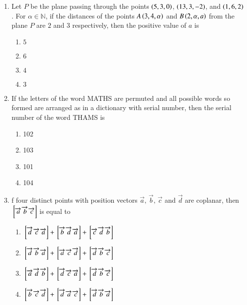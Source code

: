 \documentclass[journal,9pt,onecolumn]{IEEEtran}
\begin{document}
\begin{enumerate}
\item Let $P$ be the plane passing through the points $\left(5, 3, 0\right)$, $\left(13, 3, -2\right)$, and $\left(1, 6, 2\right)$. For $\alpha \in \mathbb{N}$, if the distances of the points $A\left(3, 4, \alpha\right)$ and $B\left(2, \alpha, a\right)$ from the plane $P$ are $2$ and $3$ respectively, then the positive value of $a$ is 
\begin{multicols}{4}
\begin{enumerate}
    \item $5$
    \item $6$
    \item $4$
    \item $3$
\end{enumerate}
\end{multicols}


\item If the letters of the word MATHS are permuted and all possible words so formed are arranged as in a dictionary with serial number, then the serial number of the word THAMS is 
\begin{multicols}{4}
\begin{enumerate}
    \item 102 
    \item 103 
    \item 101 
    \item 104 
\end{enumerate}
\end{multicols}

\item f four distinct points with position vectors $\overrightarrow{a},\, \overrightarrow{b},\, \overrightarrow{c} $ and $\overrightarrow{d}$ are coplanar, then ${}\left[\overrightarrow{a} \, \overrightarrow{b} \,\overrightarrow{c}\right]$ is equal to
\begin{multicols}{2}
\begin{enumerate}
    \item  ${}\left[\overrightarrow{d} \, \overrightarrow{c} \, \overrightarrow{a}\right] + {}\left[\overrightarrow{b} \, \overrightarrow{d} \, \overrightarrow{a}\right] + {}\left[\overrightarrow{c} \, \overrightarrow{d} \, \overrightarrow{b}\right]$ 
    \item ${}\left[\overrightarrow{d} \, \overrightarrow{b} \, \overrightarrow{a}\right] + {}\left[\overrightarrow{a} \, \overrightarrow{c} \, \overrightarrow{d}\right] + {}\left[\overrightarrow{d} \, \overrightarrow{b} \, \overrightarrow{c}\right]$
    \item ${}\left[\overrightarrow{a} \, \overrightarrow{d} \, \overrightarrow{b}\right] + {}\left[\overrightarrow{d} \, \overrightarrow{c} \, \overrightarrow{a}\right] + {}\left[\overrightarrow{d} \, \overrightarrow{b} \, \overrightarrow{c}\right]$
    \item ${}\left[\overrightarrow{b} \, \overrightarrow{c} \, \overrightarrow{d}\right] + {}\left[\overrightarrow{d} \, \overrightarrow{a} \, \overrightarrow{c}\right] + {}\left[\overrightarrow{d} \, \overrightarrow{b} \, \overrightarrow{a}\right]$
\end{enumerate}
\end{multicols}



\end{enumerate}
\end{document}
